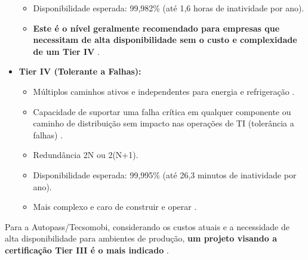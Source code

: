 \documentclass[
	12pt,				%
	oneside,			%
	a4paper,			%
	english,			%
	brazil				%
	]{abntex2unama}
\begin{document}
\begin{itemize}
\begin{itemize}
		      \item Disponibilidade esperada: 99,982\% (até 1,6 horas de inatividade por ano).
		      \item \textbf{Este é o nível geralmente recomendado para empresas que necessitam de alta disponibilidade sem o custo e complexidade de um Tier IV} \cite{capacity_planning}.
	      \end{itemize}
	\item \textbf{Tier IV (Tolerante a Falhas):}
	      \begin{itemize}
		      \item Múltiplos caminhos ativos e independentes para energia e refrigeração \cite{hyperscale_datacenters}.
		      \item Capacidade de suportar uma falha crítica em qualquer componente ou caminho de distribuição sem impacto nas operações de TI (tolerância a falhas) \cite{reliability_engineering}.
		      \item Redundância 2N ou 2(N+1).
		      \item Disponibilidade esperada: 99,995\% (até 26,3 minutos de inatividade por ano).
		      \item Mais complexo e caro de construir e operar \cite{dcim_systems}.
	      \end{itemize}
\end{itemize}
Para a Autopass/Tecsomobi, considerando os custos atuais e a necessidade de alta disponibilidade para ambientes de produção, \textbf{um projeto visando a certificação Tier III é o mais indicado} \cite{design_principles}.
\end{document}
